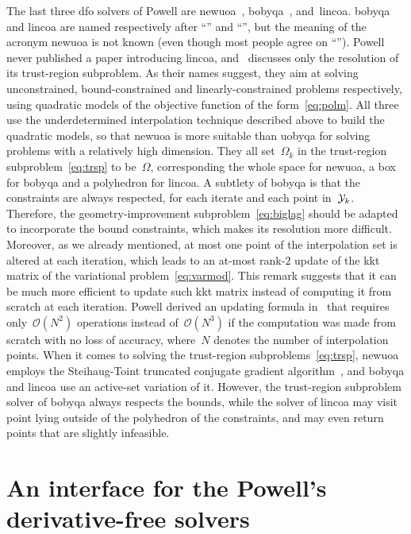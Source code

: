 \documentclass[11pt,draft]{article}
\numberwithin{equation}{section}
\newcommand{\fsetm}[1][k]{\Omega_{#1}}
\newcommand{\xpt}[1][k]{\mathcal{Y}\ifthenelse{\equal{#1}{}}{}{_{#1}}}
\begin{document}
The last three \gls{dfo} solvers of Powell are \gls{newuoa}~\cite{Powell_2006, Powell_2008},
\gls{bobyqa}~\cite{Powell_2009}, and~\gls{lincoa}.
\Gls{bobyqa} and \gls{lincoa} are named respectively after \enquote{} and \enquote{}, but the meaning of the acronym \gls{newuoa} is not known (even though most people agree on \enquote{}).
Powell never published a paper introducing \gls{lincoa}, and~\cite{Powell_2015} discusses only the resolution of its trust-region subproblem.
As their names suggest, they aim at solving unconstrained, bound-constrained and linearly-constrained problems respectively, using quadratic models of the objective function of the form~\eqref{eq:polm}.
All three use the underdetermined interpolation technique described above to build the quadratic models, so that \gls{newuoa} is more suitable than \gls{uobyqa} for solving problems with a relatively high dimension.
They all set~$\fsetm$ in the trust-region subproblem~\eqref{eq:trsp} to be~$\Omega$, corresponding the whole space for \gls{newuoa}, a box for \gls{bobyqa} and a polyhedron for \gls{lincoa}.
A subtlety of \gls{bobyqa} is that the constraints are always respected, for each iterate and each point in~$\xpt$.
Therefore, the geometry-improvement subproblem~\eqref{eq:biglag} should be adapted to incorporate the bound constraints, which makes its resolution more difficult.
Moreover, as we already mentioned, at most one point of the interpolation set is altered at each iteration, which leads to an at-most rank-$2$ update of the \gls{kkt} matrix of the variational problem~\eqref{eq:varmod}.
This remark suggests that it can be much more efficient to update such \gls{kkt} matrix instead of computing it from scratch at each iteration.
Powell derived an updating formula in~\cite{Powell_2004b} that requires only~$\mathcal{O}(N^2)$ operations instead of~$\mathcal{O}(N^3)$ if the computation was made from scratch with no loss of accuracy, where~$N$ denotes the number of interpolation points.
When it comes to solving the trust-region subproblems~\eqref{eq:trsp}, \gls{newuoa} employs the Steihaug-Toint truncated conjugate gradient algorithm~\cite{Steihaug_1983, Toint_1981}, and \gls{bobyqa} and \gls{lincoa} use an active-set variation of it.
However, the trust-region subproblem solver of \gls{bobyqa} always respects the bounds, while the solver of \gls{lincoa} may visit point lying outside of the polyhedron of the constraints, and may even return points that are slightly infeasible.


\section{An interface for the Powell's derivative-free solvers}
\label{sec:pdfo}
\end{document}
